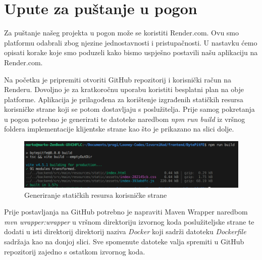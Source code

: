 \eject

\section{Upute za puštanje u pogon}

Za puštanje našeg projekta u pogon može se koristiti Render.com. Ovu smo platformu odabrali zbog njezine jednostavnosti i pristupačnosti. U nastavku ćemo opisati korake koje smo poduzeli kako bismo uspješno postavili našu aplikaciju na Render.com.


Na početku je pripremiti otvoriti GitHub repozitorij i korisnički račun na Renderu. Dovoljno je za kratkoročnu uporabu koristiti besplatni plan na obje platforme.
Aplikacija je prilagođena za korištenje izgrađenih statičkih resursa korisničke strane koji se potom dostavljaju s poslužitelja. Prije samog pokretanja u pogon potrebno je generirati te datoteke naredbom \textit{npm run build} iz vršnog foldera implementacije klijentske strane kao što je prikazano na slici dolje.

\begin{figure}[H]
	\includegraphics[scale=0.4]{slike/deployment1.png}
	\centering
	\caption{Generiranje statičkih resursa korisničke strane}
	\label{deployment1}
\end{figure}


Prije postavljanja na GitHub potrebno je napraviti Maven Wrapper naredbom \textit{mvn wrapper:wrapper} u vršnom direktoriju izvornog koda poslužiteljske strane te dodati u isti direktorij direktorij naziva \textit{Docker} koji sadrži datoteku \textit{Dockerfile} sadržaja kao na donjoj slici. Sve spomenute datoteke valja spremiti u GitHub repozitorij zajedno s ostatkom izvornog koda. 

